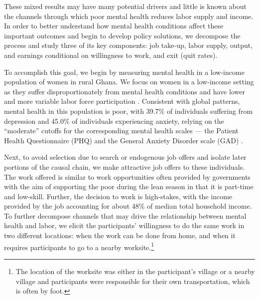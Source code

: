 \documentclass[12pt, a4paper, american]{article}
\begin{document}
These mixed results may have many potential drivers and little is known about the channels through which poor mental health reduces labor supply and income. In order to better understand how mental health conditions affect these important outcomes and begin to develop policy solutions, we decompose the process and study three of its key components: job take-up, labor supply, output, and earnings conditional on willingness to work, and exit (quit rates).

To accomplish this goal, we begin by measuring mental health in a low-income population of women in rural Ghana. We focus on women in a low-income setting as they suffer disproportionately from mental health conditions and have lower and more variable labor force participation \citep{world_health_organization_world_2022}. Consistent with global patterns, mental health in this population is poor, with 39.7\% of individuals suffering from depression and 45.0\%  of individuals experiencing anxiety, relying on the ``moderate'' cutoffs for the corresponding mental health scales --- the Patient Health Questionnaire (PHQ) and the General Anxiety Disorder scale (GAD) \citep{phq9_2001,phq2_2003,spitzer2006brief}. 

Next, to avoid selection due to search or endogenous job offers and isolate later portions of the causal chain, we make attractive job offers to these individuals. The work offered is similar to work opportunities often provided by governments with the aim of supporting the poor during the lean season in that it is part-time and low-skill. Further, the decision to work is high-stakes, with the income provided by the job accounting for about 48\% of median total household income. To further decompose channels that may drive the relationship between mental health and labor, we elicit the participants' willingness to do the same work in two different locations: when the work can be done from home, and when it requires participants to go to a nearby worksite.\footnote{The location of the worksite was either in the participant's village or a nearby village and participants were responsible for their own transportation, which is often by foot.}
\end{document}
